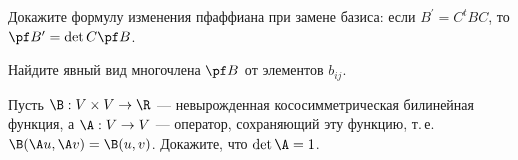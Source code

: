 \begin{problem}
    Докажите формулу изменения пфаффиана при замене базиса: если $B^\prime = C^tBC$, то $\pf B^\prime = \det C\pf B$.
\end{problem}

\begin{problem}
    Найдите явный вид многочлена $\pf B$ от элементов $b_{ij}$.
\end{problem}

\begin{problem}
    Пусть $\B: V \times V \to \R$ --- невырожденная кососимметрическая билинейная функция, а $\A: V \to V$ --- оператор, сохраняющий эту функцию, т.\,е. $\B(\A u, \A v) = \B(u, v)$. Докажите, что $\det\A = 1$.
\end{problem}

